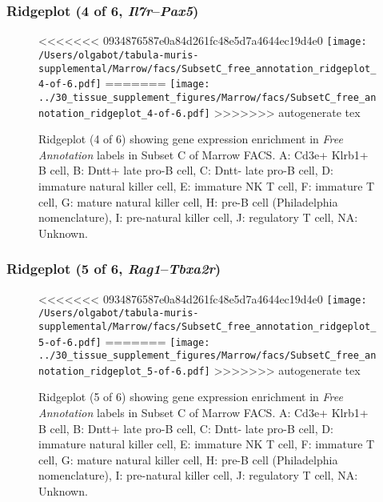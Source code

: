 \subsubsection{Ridgeplot (4 of 6, \emph{Il7r}--\emph{Pax5})}
\begin{figure}[h]
\centering
<<<<<<< 0934876587e0a84d261fc48e5d7a4644ec19d4e0
\texttt{[image: /Users/olgabot/tabula-muris-supplemental/Marrow/facs/SubsetC\_free\_annotation\_ridgeplot\_4-of-6.pdf]}
=======
\texttt{[image: ../30\_tissue\_supplement\_figures/Marrow/facs/SubsetC\_free\_annotation\_ridgeplot\_4-of-6.pdf]}
>>>>>>> autogenerate tex

\caption{ Ridgeplot (4 of 6)  showing gene expression enrichment in \emph{Free Annotation} labels in Subset C of Marrow FACS. A: Cd3e+ Klrb1+ B cell, B: Dntt+ late pro-B cell, C: Dntt- late pro-B cell, D: immature natural killer cell, E: immature NK T cell, F: immature T cell, G: mature natural killer cell, H: pre-B cell (Philadelphia nomenclature), I: pre-natural killer cell, J: regulatory T cell, NA: Unknown.}
\end{figure}


\clearpage

\subsubsection{Ridgeplot (5 of 6, \emph{Rag1}--\emph{Tbxa2r})}
\begin{figure}[h]
\centering
<<<<<<< 0934876587e0a84d261fc48e5d7a4644ec19d4e0
\texttt{[image: /Users/olgabot/tabula-muris-supplemental/Marrow/facs/SubsetC\_free\_annotation\_ridgeplot\_5-of-6.pdf]}
=======
\texttt{[image: ../30\_tissue\_supplement\_figures/Marrow/facs/SubsetC\_free\_annotation\_ridgeplot\_5-of-6.pdf]}
>>>>>>> autogenerate tex

\caption{ Ridgeplot (5 of 6)  showing gene expression enrichment in \emph{Free Annotation} labels in Subset C of Marrow FACS. A: Cd3e+ Klrb1+ B cell, B: Dntt+ late pro-B cell, C: Dntt- late pro-B cell, D: immature natural killer cell, E: immature NK T cell, F: immature T cell, G: mature natural killer cell, H: pre-B cell (Philadelphia nomenclature), I: pre-natural killer cell, J: regulatory T cell, NA: Unknown.}
\end{figure}


\clearpage

